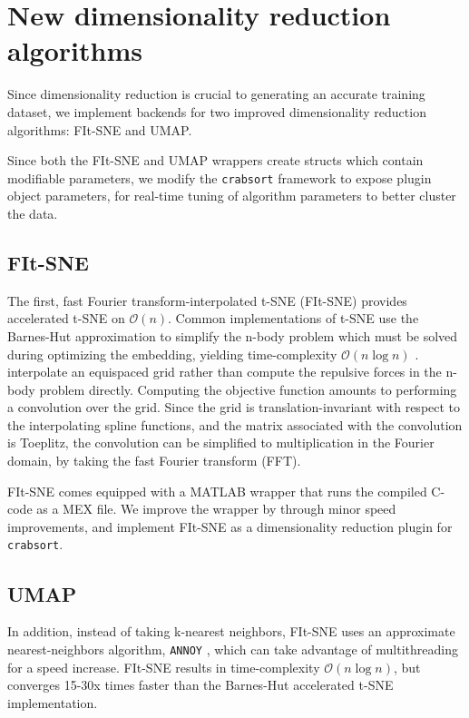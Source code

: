 \documentclass{article}
\begin{document}
\section{New dimensionality reduction algorithms}

Since dimensionality reduction is crucial to generating an accurate training dataset,
we implement backends for two improved dimensionality reduction algorithms: FIt-SNE and UMAP.

Since both the FIt-SNE and UMAP wrappers create structs which contain modifiable parameters,
we modify the \texttt{crabsort} framework to expose plugin object parameters,
for real-time tuning of algorithm parameters to better cluster the data.

\subsection{FIt-SNE}

The first, fast Fourier transform-interpolated t-SNE (FIt-SNE)
provides accelerated t-SNE on $\mathcal{O}(n)$.
Common implementations of t-SNE use the Barnes-Hut approximation to simplify the n-body problem
which must be solved during optimizing the embedding, yielding time-complexity $\mathcal{O}(n \log n)$ \autocite{vandermaatenAcceleratingTSNEUsing2014}.
\cite{lindermanFastInterpolationbasedTSNE2019} interpolate an equispaced grid
rather than compute the repulsive forces in the n-body problem directly.
Computing the objective function amounts to performing a convolution over the grid.
Since the grid is translation-invariant with respect to the interpolating spline functions,
and the matrix associated with the convolution is Toeplitz,
the convolution can be simplified to multiplication in the Fourier domain,
by taking the fast Fourier transform (FFT).

FIt-SNE comes equipped with a MATLAB wrapper that runs the compiled C-code as a MEX file.
We improve the wrapper by through minor speed improvements,
and implement FIt-SNE as a dimensionality reduction plugin for \texttt{crabsort}.

\subsection{UMAP}

In addition, instead of taking k-nearest neighbors,
FIt-SNE uses an approximate nearest-neighbors algorithm, \texttt{ANNOY} \autocite{bernhardssonApproximateNearestNeighbors2019},
which can take advantage of multithreading for a speed increase.
FIt-SNE results in time-complexity $\mathcal{O}(n \log n)$,
but converges 15-30x times faster than the Barnes-Hut accelerated t-SNE implementation.
\end{document}

